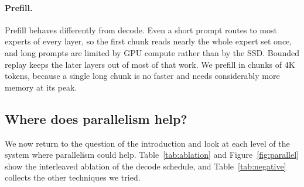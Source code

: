 \paragraph{Prefill.} Prefill behaves differently from decode. Even a short prompt routes to most experts of every layer, so the first chunk reads nearly the whole expert set once, and long prompts are limited by GPU compute rather than by the SSD. Bounded replay keeps the later layers out of most of that work. We prefill in chunks of 4K tokens, because a single long chunk is no faster and needs considerably more memory at its peak.

\subsection{Where does parallelism help?}
\label{sec:parallel-eval}
We now return to the question of the introduction and look at each level of the system where parallelism could help. Table~\ref{tab:ablation} and Figure~\ref{fig:parallel} show the interleaved ablation of the decode schedule, and Table~\ref{tab:negative} collects the other techniques we tried.

\begin{table}[t]
\centering
\small
\caption{Decode schedules at a 5\,GB cache, interleaved in one process. Speed-ups are paired against the serial schedule of the same round, with 95\% confidence intervals over 12 blocks. All speculative schedules read three guesses per layer. In the first run the naive prefetcher ranks its guesses by the raw gate logits; the second run repeats the key schedules with the router's exact scoring for every prefetcher. Tokens per second and SSD wait are from the first run.}
\label{tab:ablation}
\end{table}

